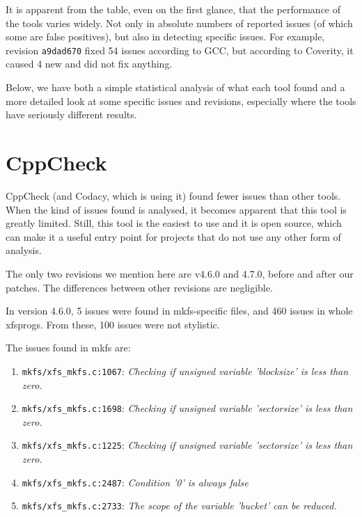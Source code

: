 It is apparent from the table, even on the first glance, that the performance
of the tools varies widely. Not only in absolute numbers of reported issues (of
which some are false positives), but also in detecting specific issues. For
example, revision {\tt a9dad670} fixed 54 issues according to GCC, but
according to Coverity, it caused 4 new and did not fix anything.

Below, we have both a simple statistical analysis of what each
tool found and a more detailed look at some specific issues and revisions,
especially where the tools have seriously different results.



\section{CppCheck}\label{chap:results:cppcheck}
CppCheck (and Codacy, which is using it) found fewer issues than other
tools. When the kind of issues found is analysed, it becomes apparent that
this tool is greatly limited. Still, this tool is the easiest to use and it is
open source, which can make it a useful entry point for projects that do not
use any other form of analysis.

The only two revisions we mention here are v4.6.0 and 4.7.0, before and after
our patches. The differences between other revisions are negligible.

In version 4.6.0, 5 issues were found in mkfs-specific
files, and 460 issues in whole xfsprogs. From these, 100 issues were not
stylistic.

The issues found in mkfs are:
\begin{enumerate}
	\item {\tt mkfs/xfs\_mkfs.c:1067}: {\em Checking if unsigned variable
		'blocksize' is less than zero.}
	\item {\tt mkfs/xfs\_mkfs.c:1698}: {\em Checking if unsigned variable
		'sectorsize' is less than zero.}
	\item {\tt mkfs/xfs\_mkfs.c:1225}: {\em Checking if unsigned variable
		'sectorsize' is less than zero.}
	\item {\tt mkfs/xfs\_mkfs.c:2487}: {\em Condition '0' is always false}
	\item {\tt mkfs/xfs\_mkfs.c:2733}: {\em The scope of the variable 'bucket'
		can be reduced.}
\end{enumerate}

